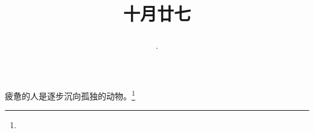 \title{\date[d=27,m=11,y=2024][year:cn-y,年,month:cn,day:cn,日,·,weekday]·十月廿七 }
疲惫的人是逐步沉向孤独的动物。\footnote{ }

